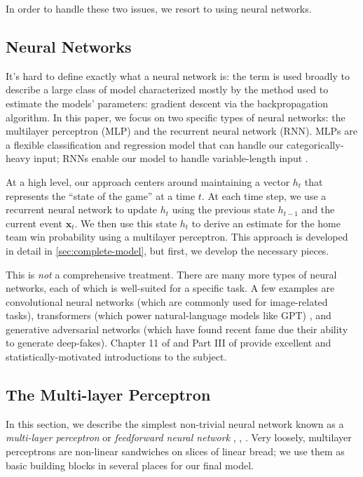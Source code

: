 In order to handle these two issues, we resort to using neural networks.

\subsection{Neural Networks}

It's hard to define exactly what a neural network is: the term is used broadly to describe a large class of model characterized mostly by the method used to estimate the models' parameters: gradient descent via the backpropagation algorithm. In this paper, we focus on two specific types of neural networks: the multilayer perceptron (MLP) and the recurrent neural network (RNN). MLPs are a flexible classification and regression model that can handle our categorically-heavy input; RNNs enable our model to handle variable-length input \cite{PML}.

At a high level, our approach centers around maintaining a vector $h_t$ that represents the ``state of the game'' at a time $t$. At each time step, we use a recurrent neural network to update $h_t$ using the previous state $h_{t-1}$ and the current event $\mathbf x_t$. We then use this state $h_t$ to derive an estimate for the home team win probability using a multilayer perceptron. This approach is developed in detail in \autoref{sec:complete-model}, but first, we develop the necessary pieces.

This is \emph{not} a comprehensive treatment. There are many more types of neural networks, each of which is well-suited for a specific task. A few examples are convolutional neural networks (which are commonly used for image-related tasks), transformers (which power natural-language models like GPT) \cite{attention-is-all-you-need}, and generative adversarial networks (which have found recent fame due their ability to generate deep-fakes). Chapter 11 of \textcite{ESL} and Part III of \textcite{PML} provide excellent and statistically-motivated introductions to the subject.

\subsection{The Multi-layer Perceptron}

In this section, we describe the simplest non-trivial neural network known as a \emph{multi-layer perceptron} or \emph{feedforward neural network} \cite[\S 10.1]{ISL}, \cite[\S 11.3]{ESL}, \cite[13.2]{PML}. Very loosely, multilayer perceptrons are non-linear sandwiches on slices of linear bread; we use them as basic building blocks in several places for our final model.

